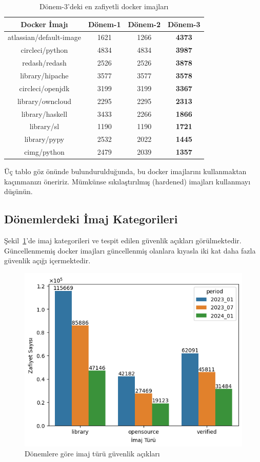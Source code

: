 \begin{table}[!htbp]
    \caption{Dönem-3'deki en zafiyetli docker imajları}\label{tab:most-vuln-images-p3}
    \centering
    \begin{tabular}{ |c|c|c|>{\bfseries}c| }
        \hline
        Docker İmajı & Dönem-1 & Dönem-2 & Dönem-3 \\
        \hline
        atlassian/default-image & 1621 & 1266 & 4373 \\
        circleci/python         & 4834 & 4834 & 3987 \\
        redash/redash           & 2526 & 2526 & 3878 \\
        library/hipache         & 3577 & 3577 & 3578 \\
        circleci/openjdk        & 3199 & 3199 & 3367 \\
        library/owncloud        & 2295 & 2295 & 2313 \\
        library/haskell         & 3433 & 2266 & 1866 \\
        library/sl              & 1190 & 1190 & 1721 \\
        library/pypy            & 2532 & 2022 & 1445 \\
        cimg/python             & 2479 & 2039 & 1357 \\
        \hline
    \end{tabular}
\end{table}

Üç tablo göz önünde bulundurulduğunda, bu docker imajlarını kullanmaktan kaçınmanızı öneririz. Mümkünse sıkılaştırılmış (hardened) imajları kullanmayı düşünün.

\subsection{Dönemlerdeki İmaj Kategorileri}\label{subsec:image-categories-in-periods}

Şekil~\ref{fig:image-type-by-periods}'de imaj kategorileri ve tespit edilen güvenlik açıkları görülmektedir. Güncellenmemiş docker imajları güncellenmiş olanlara kıyasla iki kat daha fazla güvenlik açığı içermektedir.

\begin{figure}[!htbp]
    \centering
    \includegraphics[width=.8\linewidth]{images/s2/image-type-by-periods.png}
    \caption{Dönemlere göre imaj türü güvenlik açıkları}\label{fig:image-type-by-periods}
\end{figure}

